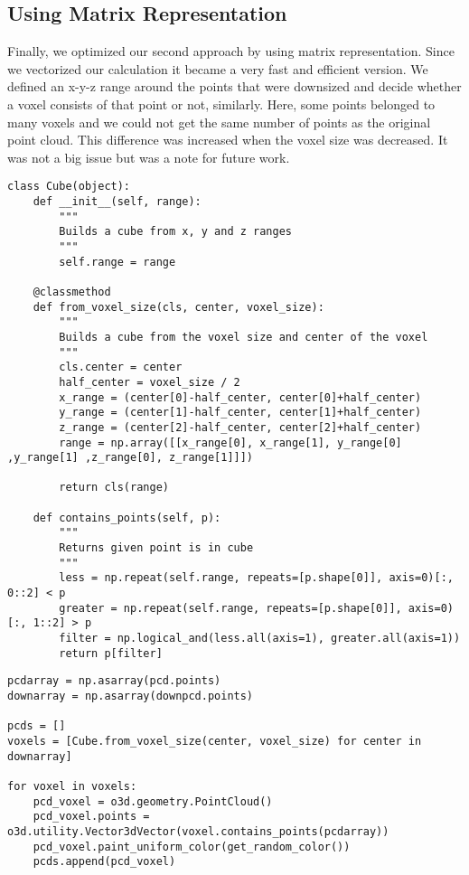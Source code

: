 \documentclass[a4paper]{article}
\begin{document}
\subsection{Using Matrix Representation}
Finally, we optimized our second approach by using matrix representation. Since we vectorized our calculation it became a very fast and efficient version. We defined an x-y-z range around the points that were downsized and decide whether a voxel consists of that point or not, similarly. Here, some points belonged to many voxels and we could not get the same number of points as the original point cloud. This difference was increased when the voxel size was decreased. It was not a big issue but was a note for future work.
\begin{lstlisting}[caption={\texttt{Cube} class matrix implementation.}]
class Cube(object):
    def __init__(self, range):
        """
        Builds a cube from x, y and z ranges
        """
        self.range = range

    @classmethod
    def from_voxel_size(cls, center, voxel_size):
        """
        Builds a cube from the voxel size and center of the voxel
        """
        cls.center = center
        half_center = voxel_size / 2
        x_range = (center[0]-half_center, center[0]+half_center)
        y_range = (center[1]-half_center, center[1]+half_center)
        z_range = (center[2]-half_center, center[2]+half_center)
        range = np.array([[x_range[0], x_range[1], y_range[0] ,y_range[1] ,z_range[0], z_range[1]]])
        
        return cls(range)

    def contains_points(self, p):
        """
        Returns given point is in cube
        """
        less = np.repeat(self.range, repeats=[p.shape[0]], axis=0)[:, 0::2] < p
        greater = np.repeat(self.range, repeats=[p.shape[0]], axis=0)[:, 1::2] > p
        filter = np.logical_and(less.all(axis=1), greater.all(axis=1))
        return p[filter]
\end{lstlisting}

\begin{lstlisting}[caption={Splitting our data into voxels using our \texttt{Cube} structure using matrix implementation.}]
pcdarray = np.asarray(pcd.points)
downarray = np.asarray(downpcd.points)

pcds = []
voxels = [Cube.from_voxel_size(center, voxel_size) for center in downarray]

for voxel in voxels:
    pcd_voxel = o3d.geometry.PointCloud()
    pcd_voxel.points = o3d.utility.Vector3dVector(voxel.contains_points(pcdarray))
    pcd_voxel.paint_uniform_color(get_random_color())
    pcds.append(pcd_voxel)
\end{lstlisting}
\end{document}
